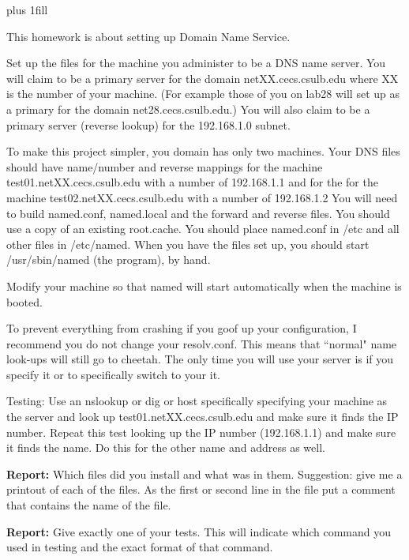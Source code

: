 
\rightskip=0pt plus 1fill

\parindent 0pt

This homework is about setting up Domain Name Service.

Set up the files for the machine you administer
to be a DNS name server. 
You will claim to be a primary server for the domain netXX.cecs.csulb.edu 
where XX is the number of your machine.
(For example those of you on lab28 will set up as a primary
for the domain net28.cecs.csulb.edu.)
You will also claim to be a primary
server (reverse lookup) for the 192.168.1.0 subnet.

To make this project simpler, you domain has only two machines.
Your DNS files should have name/number and reverse mappings
for the machine {\ltt{}test01.netXX.cecs.csulb.edu} 
with a number of {\ltt{}192.168.1.1}
and for the 
for the machine {\ltt{}test02.netXX.cecs.csulb.edu} 
with a number of {\ltt{}192.168.1.2}
You will need to build {\ltt{}named.conf},
{\ltt{}named.local} and the forward and reverse files.
You should use a copy of an existing {\ltt{}root.cache}.
You should place {\ltt{}named.conf} in {\ltt{}/etc}
and all other files in {\ltt{}/etc/named}.
When you have the files set up, you should start {\ltt{}/usr/sbin/named} 
(the program), by hand.

Modify your machine so that {\ltt{}named} will start automatically
when the machine is booted.

To prevent everything from crashing if you goof up your configuration,
I recommend you do not change your {\ltt{}resolv.conf}.
This means that ``normal" name look-ups will still go to {\ltt{}cheetah}.
The only time you will use your server is if you specify it or
to specifically switch to your it.

Testing: Use an {\ltt{}nslookup} or {\ltt{}dig} or {\ltt{}host}
specifically specifying your machine as the server and look up
{\ltt{}test01.netXX.cecs.csulb.edu} and make sure it finds the IP number.
Repeat this test looking up the IP number ({\ltt{}192.168.1.1})
and make sure it finds the name.
Do this for the other name and address as well.

{\bf Report:} Which files did you install and what was in them.
Suggestion: give me a printout of each of the files. As the first or second
line in the file put a comment that contains the name of the file.

{\bf Report:} Give exactly one of your tests.
This will indicate which command you used in testing and the
exact format of that command.

\bye
